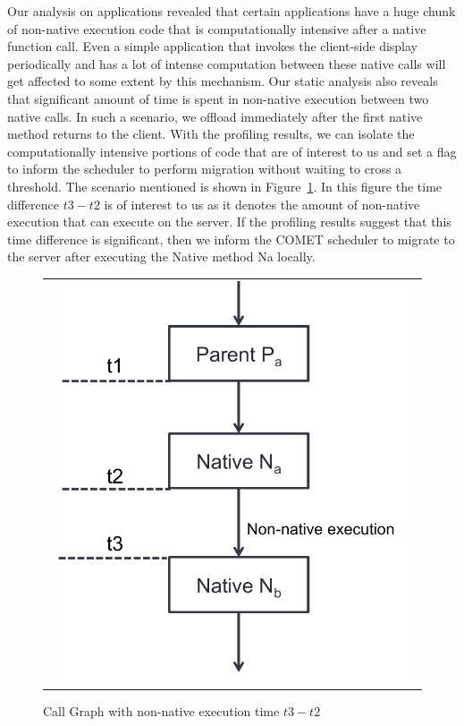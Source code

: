 Our analysis on applications revealed that certain applications have a huge chunk of non-native execution code that is computationally
intensive after a native function call. Even a simple application that invokes the client-side display periodically and has a lot of intense
computation between these native calls will get affected to some extent by this mechanism. Our static analysis also reveals that significant
amount of time is spent in non-native execution between two native calls. In such a scenario, we offload immediately after the first
native method returns to the client. With the profiling results, we can isolate the computationally intensive portions of code that
are of interest to us and set a flag to inform the scheduler to perform migration without waiting to cross a threshold. The scenario
mentioned is shown in Figure~\ref{fig:native_native}. In this figure the time difference $t3-t2$ is of interest to us as it denotes the amount
of non-native execution that can execute on the server. If the profiling results suggest that this time difference is significant, then we
inform the COMET scheduler to migrate to the server after executing the Native method Na locally.

\begin{figure} [thf*]
\centering
\begin{tabular}{c}
\begin{minipage}[b]{0.5\textwidth}
\includegraphics[width=0.95\textwidth]{figs/native_native.pdf}
\end{minipage}
\end{tabular}
\caption{Call Graph with non-native execution time $t3-t2$}
\label{fig:native_native}
\end{figure}

